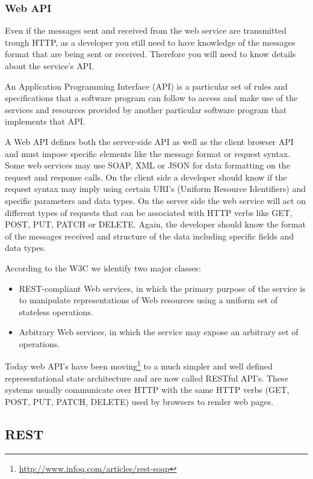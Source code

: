 \subsubsection{Web API}
\label{sub-sub-sec:web-api}

Even if the messages sent and received from the web service are transmitted trough HTTP, as a developer you still need to have knowledge of the messages format that are being sent or received. Therefore you will need to know details about the service's API.

An Application Programming Interface (API) is a particular
set of rules and specifications that a software program can follow to access and make use of the services
and resources provided by another particular software program that implements that API.

A Web API defines both the server-side API as well as the client browser API and must impose specific elements like the message format or request syntax. Some web services may use SOAP, XML or JSON for data formatting on the request and response calls. On the client side a developer should know if the request syntax may imply using certain URI's (Uniform Resource Identifiers) and specific parameters and data types. On the server side the web service will act on different types of requests that can be associated with HTTP verbs like GET, POST, PUT, PATCH or DELETE. Again, the developer should know the format of the messages received and structure of the data including specific fields and data types.

According to the W3C \cite{W3C} we identify two major classes:
\begin{itemize}
	\item REST-compliant Web services, in which the primary purpose of the service is to manipulate representations of Web resources using a uniform set of stateless operations.
	\item Arbitrary Web services, in which the service may expose an arbitrary set of operations. 
\end{itemize}

Today web API's have been moving\footnote{\url{http://www.infoq.com/articles/rest-soap}} to a much simpler and well defined representational state architecture and are now called RESTful API's. These systems usually communicate over HTTP with the same HTTP verbs (GET, POST, PUT, PATCH, DELETE) used by browsers to render web pages.

\subsection{REST}
\label{sub-sec:rest}

